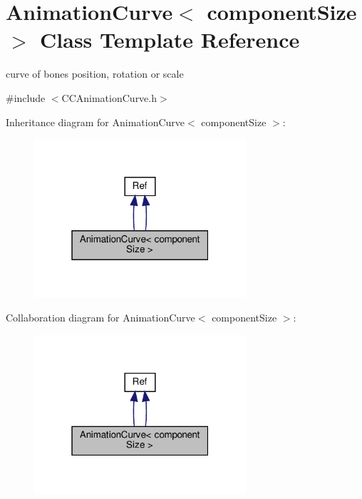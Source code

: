 \hypertarget{classAnimationCurve}{}\section{Animation\+Curve$<$ component\+Size $>$ Class Template Reference}
\label{classAnimationCurve}


curve of bone\textquotesingle{}s position, rotation or scale  




{\ttfamily \#include $<$C\+C\+Animation\+Curve.\+h$>$}



Inheritance diagram for Animation\+Curve$<$ component\+Size $>$\+:
\nopagebreak
\begin{figure}[H]
\begin{center}
\leavevmode
\includegraphics[width=223pt]{classAnimationCurve__inherit__graph}
\end{center}
\end{figure}


Collaboration diagram for Animation\+Curve$<$ component\+Size $>$\+:
\nopagebreak
\begin{figure}[H]
\begin{center}
\leavevmode
\includegraphics[width=223pt]{classAnimationCurve__coll__graph}
\end{center}
\end{figure}
